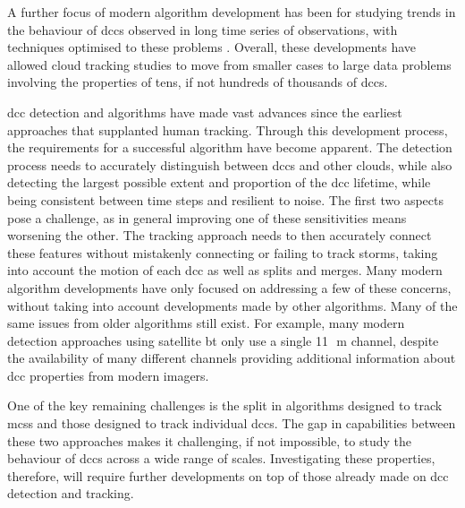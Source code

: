 A further focus of modern algorithm development has been for studying trends in the behaviour of \acrshort{dcc}s observed in long time series of observations, with techniques optimised to these problems \citep{ocasio_tracking_2020, hayden_properties_2021}.
Overall, these developments have allowed cloud tracking studies to move from smaller cases to large data problems involving the properties of tens, if not hundreds of thousands of \acrshort{dcc}s.

\acrshort{dcc} detection and algorithms have made vast advances since the earliest approaches that supplanted human tracking.
Through this development process, the requirements for a successful algorithm have become apparent.
The detection process needs to accurately distinguish between \acrshort{dcc}s and other clouds, while also detecting the largest possible extent and proportion of the \acrshort{dcc} lifetime, while being consistent between time steps and resilient to noise.
The first two aspects pose a challenge, as in general improving one of these sensitivities means worsening the other.
The tracking approach needs to then accurately connect these features without mistakenly connecting or failing to track storms, taking into account the motion of each \acrshort{dcc} as well as splits and merges.
Many modern algorithm developments have only focused on addressing a few of these concerns, without taking into account developments made by other algorithms.
Many of the same issues from older algorithms still exist.
For example, many modern detection approaches using satellite \acrshort{bt} only use a single 11\,\unit{\mu m} channel, despite the availability of many different channels providing additional information about \acrshort{dcc} properties from modern imagers.

One of the key remaining challenges is the split in algorithms designed to track \acrshort{mcs}s and those designed to track individual \acrshort{dcc}s.
The gap in capabilities between these two approaches makes it challenging, if not impossible, to study the behaviour of \acrshort{dcc}s across a wide range of scales.
Investigating these properties, therefore, will require further developments on top of those already made on \acrshort{dcc} detection and tracking.


